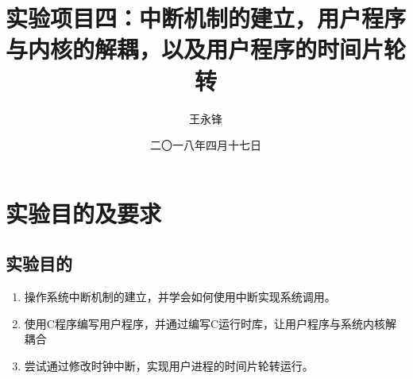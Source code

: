 \documentclass[forprint]{WHUBachelor}
\begin{document}

\title{实验项目四：中断机制的建立，用户程序与内核的解耦，以及用户程序的时间片轮转}
\author{王永锋}                            %
\date{二〇一八年四月十七日}                %

\maketitle
\frontmatter
{}              %
\tableofcontents
\mainmatter %

\chapter{实验目的及要求}

\section{实验目的}

\begin{enumerate}
  \item 操作系统中断机制的建立，并学会如何使用中断实现系统调用。
  \item 使用C程序编写用户程序，并通过编写C运行时库，让用户程序与系统内核解耦合
  \item 尝试通过修改时钟中断，实现用户进程的时间片轮转运行。
\end{enumerate}
\end{document}
